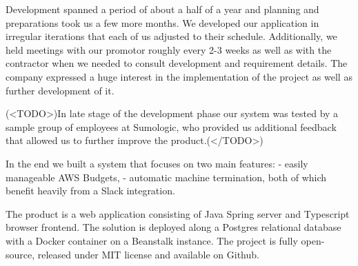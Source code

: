 \documentclass[licencjacka,en]{thesisclass}
\begin{document}
    Development spanned a period of about a half of a year and planning and preparations took us
    a few more months.
    We developed our application in irregular iterations that each of us adjusted
    to their schedule.
    Additionally, we held meetings with our promotor roughly every 2-3 weeks
    as well as with the contractor when we needed to consult development and requirement details.
    The company expressed a huge interest in the implementation of the project
    as well as further development of it.

    (<TODO>)In late stage of the development phase our system was tested
    by a sample group of employees at Sumologic, who provided us additional feedback
    that allowed us to further improve the product.(</TODO>)

    In the end we built a system that focuses on two main features:
    - easily manageable AWS Budgets,
    - automatic machine termination,
    both of which benefit heavily from a Slack integration.

    The product is a web application consisting of Java Spring server and Typescript browser
    frontend.
    The solution is deployed along a Postgres relational database with a Docker container
    on a Beanstalk instance.
    The project is fully open-source, released under MIT license
    and available on Github.
\end{document}
